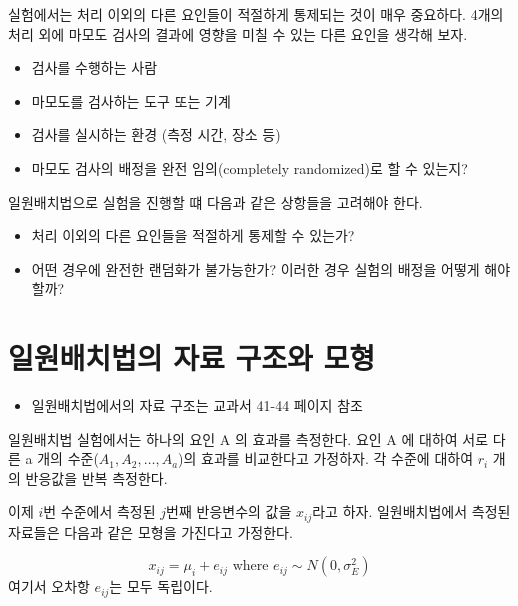 \documentclass[
]{book}
\providecommand{\tightlist}{%
  \setlength{\itemsep}{0pt}\setlength{\parskip}{0pt}}
\begin{document}
실험에서는 처리 이외의 다른 요인들이 적절하게 통제되는 것이 매우 중요하다.
4개의 처리 외에 마모도 검사의 결과에 영향을 미칠 수 있는 다른 요인을 생각해 보자.

\begin{itemize}
\tightlist
\item
  검사를 수행하는 사람
\item
  마모도를 검사하는 도구 또는 기계
\item
  검사를 실시하는 환경 (측정 시간, 장소 등)
\item
  마모도 검사의 배정을 완전 임의(completely randomized)로 할 수 있는지?
\end{itemize}

일원배치법으로 실험을 진행할 떄 다음과 같은 상항들을 고려해야 한다.

\begin{itemize}
\tightlist
\item
  처리 이외의 다른 요인들을 적절하게 통제할 수 있는가?
\item
  어떤 경우에 완전한 랜덤화가 불가능한가? 이러한 경우 실험의 배정을 어떻게 해야 할까?
\end{itemize}

\hypertarget{uxc77cuxc6d0uxbc30uxce58uxbc95uxc758-uxc790uxb8cc-uxad6cuxc870uxc640-uxbaa8uxd615}{%
\section{일원배치법의 자료 구조와 모형}\label{uxc77cuxc6d0uxbc30uxce58uxbc95uxc758-uxc790uxb8cc-uxad6cuxc870uxc640-uxbaa8uxd615}}

\begin{itemize}
\tightlist
\item
  일원배치법에서의 자료 구조는 교과서 41-44 페이지 참조
\end{itemize}

일원배치법 실험에서는 하나의 요인 A 의 효과를 측정한다. 요인 A 에 대하여 서로 다른 a 개의 수준(\(A_1, A_2, \dots, A_a\))의 효과를 비교한다고 가정하자. 각 수준에 대하여 \(r_i\) 개의 반응값을 반복 측정한다.

이제 \(i\)번 수준에서 측정된 \(j\)번째 반응변수의 값을 \(x_{ij}\)라고 하자. 일원배치법에서 측정된 자료들은 다음과 같은 모형을 가진다고 가정한다.

\begin{equation}
x_{ij} = \mu_i + e_{ij} \text{ where } e_{ij} \sim N(0,\sigma_E^2)
\label{eq:onewaymodel1}
\end{equation}
여기서 오차항 \(e_{ij}\)는 모두 독립이다.
\end{document}
